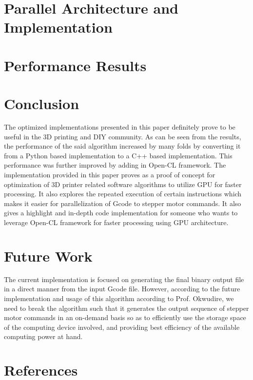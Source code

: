 \documentclass[12pt,letterpaper]{article}
\begin{document}
\section{Parallel Architecture and Implementation}

\section{Performance Results}

\section{Conclusion}
The optimized implementations presented in this paper definitely prove to be useful in the 3D printing and DIY community. As can be seen from the results, the performance of the said algorithm increased by many folds by converting it from a Python based implementation to a C++ based implementation. This performance was further improved by adding in Open-CL framework. The implementation provided in this paper proves as a proof of concept for optimization of 3D printer related software algorithms to utilize GPU for faster processing. It also explores the repeated execution of certain instructions which makes it easier for parallelization of Gcode to stepper motor commands.
It also gives a highlight and in-depth code implementation for someone who wants to leverage Open-CL framework for faster processing using GPU architecture.

\section{Future Work}
The current implementation is focused on generating the final binary output file in a direct manner from the input Gcode file. However, according to the future implementation and usage of this algorithm according to Prof. Okwudire, we need to break the algorithm such that it generates the output sequence of stepper motor commands in an on-demand basis so as to efficiently use the storage space of the computing device involved, and providing best efficiency of the available computing power at hand.

\section{References\label{sec:references}}

\printbibliography[heading=none]
\end{document}

